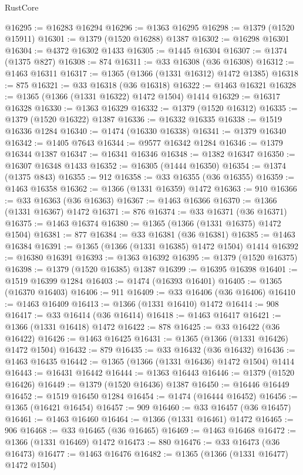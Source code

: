 \begin{lexlean}{RustCore}
\begin{coremodule}
@16295 := @16283 @16294
@16296 := @1363 @16295
@16298 := @1379 (@1520 @15911)
@16301 := @1379 (@1520 @16288) @1387
@16302 := @16298 @16301
@16304 := @4372 @16302 @1433
@16305 := @1445 @16304
@16307 := @1374 (@1375 @827)
@16308 := 874
@16311 := @33 @16308 (@36 @16308)
@16312 := @1463 @16311
@16317 := @1365 (@1366 (@1331 @16312) @1472 @1385)
@16318 := 875
@16321 := @33 @16318 (@36 @16318)
@16322 := @1463 @16321
@16328 := @1365 (@1366 (@1331 @16322) @1472 @1504) @1414
@16329 := @16317 @16328
@16330 := @1363 @16329
@16332 := @1379 (@1520 @16312)
@16335 := @1379 (@1520 @16322) @1387
@16336 := @16332 @16335
@16338 := @1519 @16336 @1284
@16340 := @1474 (@16330 @16338)
@16341 := @1379 @16340
@16342 := @1405 @7643
@16344 := @9577 @16342 @1284
@16346 := @1379 @16344 @1387
@16347 := @16341 @16346
@16348 := @1382 @16347
@16350 := @16307 @16348 @1433
@16352 := @16305 (@1444 @16350)
@16354 := @1374 (@1375 @843)
@16355 := 912
@16358 := @33 @16355 (@36 @16355)
@16359 := @1463 @16358
@16362 := @1366 (@1331 @16359) @1472
@16363 := 910
@16366 := @33 @16363 (@36 @16363)
@16367 := @1463 @16366
@16370 := @1366 (@1331 @16367) @1472
@16371 := 876
@16374 := @33 @16371 (@36 @16371)
@16375 := @1463 @16374
@16380 := @1365 (@1366 (@1331 @16375) @1472 @1504)
@16381 := 877
@16384 := @33 @16381 (@36 @16381)
@16385 := @1463 @16384
@16391 := @1365 (@1366 (@1331 @16385) @1472 @1504) @1414
@16392 := @16380 @16391
@16393 := @1363 @16392
@16395 := @1379 (@1520 @16375)
@16398 := @1379 (@1520 @16385) @1387
@16399 := @16395 @16398
@16401 := @1519 @16399 @1284
@16403 := @1474 (@16393 @16401)
@16405 := @1365 (@16370 @16403)
@16406 := 911
@16409 := @33 @16406 (@36 @16406)
@16410 := @1463 @16409
@16413 := @1366 (@1331 @16410) @1472
@16414 := 908
@16417 := @33 @16414 (@36 @16414)
@16418 := @1463 @16417
@16421 := @1366 (@1331 @16418) @1472
@16422 := 878
@16425 := @33 @16422 (@36 @16422)
@16426 := @1463 @16425
@16431 := @1365 (@1366 (@1331 @16426) @1472 @1504)
@16432 := 879
@16435 := @33 @16432 (@36 @16432)
@16436 := @1463 @16435
@16442 := @1365 (@1366 (@1331 @16436) @1472 @1504) @1414
@16443 := @16431 @16442
@16444 := @1363 @16443
@16446 := @1379 (@1520 @16426)
@16449 := @1379 (@1520 @16436) @1387
@16450 := @16446 @16449
@16452 := @1519 @16450 @1284
@16454 := @1474 (@16444 @16452)
@16456 := @1365 (@16421 @16454)
@16457 := 909
@16460 := @33 @16457 (@36 @16457)
@16461 := @1463 @16460
@16464 := @1366 (@1331 @16461) @1472
@16465 := 906
@16468 := @33 @16465 (@36 @16465)
@16469 := @1463 @16468
@16472 := @1366 (@1331 @16469) @1472
@16473 := 880
@16476 := @33 @16473 (@36 @16473)
@16477 := @1463 @16476
@16482 := @1365 (@1366 (@1331 @16477) @1472 @1504)

\end{coremodule}
\end{lexlean}
